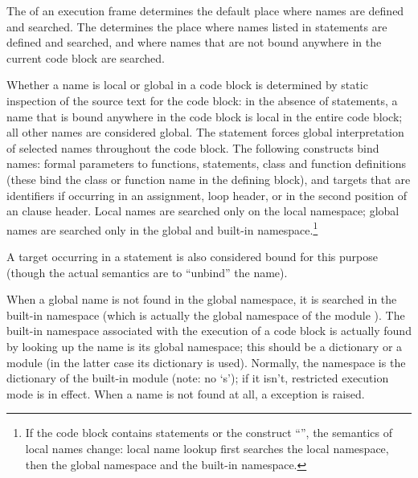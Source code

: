 The  of an execution
frame determines the default place where names are defined and
searched.  The
 determines the place
where names listed in  statements are
defined and searched, and where names that are not bound anywhere in
the current code block are searched.

Whether a name is local or global in a code block is determined by
static inspection of the source text for the code block: in the
absence of  statements, a name that is bound anywhere
in the code block is local in the entire code block; all other names
are considered global.  The  statement forces global
interpretation of selected names throughout the code block.  The
following constructs bind names: formal parameters to functions,
 statements, class and function definitions (these
bind the class or function name in the defining block), and targets
that are identifiers if occurring in an assignment,  loop
header, or in the second position of an  clause
header.  Local names are searched only on the local namespace; global
names are searched only in the global and built-in
namespace.\footnote{
  If the code block contains  statements or the
  construct ``'', the semantics of local
  names change: local name lookup first searches the local namespace,
  then the global namespace and the built-in namespace.}

A target occurring in a  statement is also considered bound
for this purpose (though the actual semantics are to ``unbind'' the
name).

When a global name is not found in the global namespace, it is
searched in the built-in namespace (which is actually the global
namespace of the module
).  The built-in
namespace associated with the execution of a code block is actually
found by looking up the name  is its global
namespace; this should be a dictionary or a module (in the latter case
its dictionary is used).  Normally, the  namespace
is the dictionary of the built-in module  (note:
no `s'); if it isn't, restricted
execution mode is in effect.  When a 
name is not found at all, a
 exception is raised.

